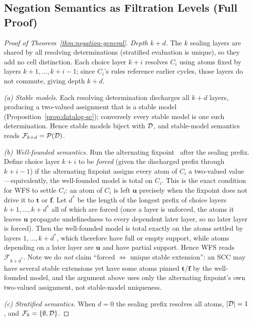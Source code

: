 \subsection{Negation Semantics as Filtration Levels (Full Proof)}

\begin{proof}[Proof of Theorem~\ref{thm:negation-general}]
  \emph{Depth $k{+}d$.} The $k$ sealing layers are shared by all resolving
  determinations (stratified evaluation is unique), so they add no cell
  distinction. Each choice layer $k{+}i$ resolves $C_i$ using atoms fixed by
  layers $k{+}1, \dots, k{+}i{-}1$; since $C_i$'s rules reference earlier
  cycles, those layers do not commute, giving depth $k{+}d$.

  \emph{(a) Stable models.} Each resolving determination discharges all $k{+}d$
  layers, producing a two-valued assignment that is a stable model
  (Proposition~\ref{prop:datalog-sc}); conversely every stable model is one
  such determination. Hence stable models biject with $\mathcal{D}$, and
  stable-model semantics reads $\mathcal{F}_{k+d} = \mathcal{P}(\mathcal{D})$.

  \emph{(b) Well-founded semantics.} Run the alternating
  fixpoint~\cite{vanGelder1991wellFounded} after the sealing prefix. Define
  choice layer $k{+}i$ to be \emph{forced} (given the discharged prefix through
  $k{+}i{-}1$) if the alternating fixpoint assigns every atom of $C_i$ a
  two-valued value---equivalently, the well-founded model is total on $C_i$.
  This is the exact condition for WFS to settle $C_i$: an atom of $C_i$ is left
  $\mathbf{u}$ precisely when the fixpoint does not drive it to $\mathbf{t}$ or
  $\mathbf{f}$. Let $d^\ast$ be the length of the longest prefix of choice
  layers $k{+}1, \dots, k{+}d^\ast$ all of which are forced (once a layer is
  unforced, the atoms it leaves $\mathbf{u}$ propagate undefinedness to every
  dependent later layer, so no later layer is forced). Then the well-founded
  model is total exactly on the atoms settled by layers $1, \dots, k{+}d^\ast$,
  which therefore have full or empty support, while atoms depending on a later
  layer are $\mathbf{u}$ and have partial support. Hence WFS reads
  $\mathcal{F}_{k+d^\ast}$. Note we do \emph{not} claim ``forced $\Leftrightarrow$
  unique stable extension'': an SCC may have several stable extensions yet have
  some atoms pinned $\mathbf{t}$/$\mathbf{f}$ by the well-founded model, and the
  argument above uses only the alternating fixpoint's own two-valued
  assignment, not stable-model uniqueness.

  \emph{(c) Stratified semantics.} When $d = 0$ the sealing prefix resolves
  all atoms, $|\mathcal{D}| = 1$, and $\mathcal{F}_k = \{\emptyset, \mathcal{D}\}$.
\end{proof}

